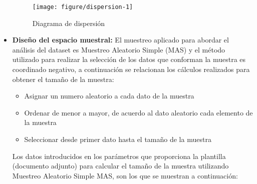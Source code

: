 \begin{itemize}
\begin{figure}[ht]
\begin{kframe}
\begin{alltt}


        \hlstd{(}\hlstd{))} \hlopt{+} \hlstd{()}
\end{alltt}


{\ttfamily\noindent\bfseries\color{errorcolor}{\#\# Error in eval(expr, envir, enclos): objeto 'TPH' no encontrado}}\end{kframe}
\texttt{[image: figure/dispersion-1]} 

		\caption{Diagrama de dispersión}
		\label{fig:diagrama_dispersion}
	\end{figure}
	
	\item \textbf {Diseño del espacio muestral:}
	El muestreo aplicado para abordar el análisis del dataset es Muestreo Aleatorio Simple (MAS) y el método utilizado para realizar la selección de los datos que conforman la muestra es coordinado negativo, a continuación se relacionan los cálculos realizados para obtener el tamaño de la muestra:
	\bigskip
	\begin{itemize}
		\item Asignar un numero aleatorio a cada dato de la muestra
		\item Ordenar de menor a mayor, de acuerdo al dato aleatorio cada elemento de la muestra
		\item Seleccionar desde primer dato hasta el tamaño de la muestra
	\end{itemize}
	\bigskip
	Los datos introducidos en los parámetros que proporciona la plantilla (documento adjunto) para calcular el tamaño de la muestra utilizando Muestreo Aleatorio Simple MAS, son los que se muestran a continuación:\\
	

\end{itemize}
